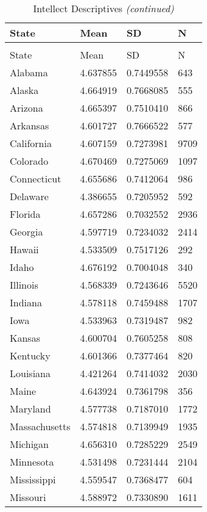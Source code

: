 \documentclass[
]{article}
\begin{document}
\begin{landscape}
\begin{longtable}[t]{llll}
\caption{\label{tab:KableOuput}Intellect Descriptives}\\
\toprule
State & Mean & SD & N\\
\midrule
\endfirsthead
\caption[]{\label{tab:KableOuput}Intellect Descriptives \textit{(continued)}}\\
\toprule
State & Mean & SD & N\\
\midrule
\endhead

\endfoot
\bottomrule
\endlastfoot
Alabama & 4.637855 & 0.7449558 & 643\\
Alaska & 4.664919 & 0.7668085 & 555\\
Arizona & 4.665397 & 0.7510410 & 866\\
Arkansas & 4.601727 & 0.7666522 & 577\\
California & 4.607159 & 0.7273981 & 9709\\
\addlinespace
Colorado & 4.670469 & 0.7275069 & 1097\\
Connecticut & 4.655686 & 0.7412064 & 986\\
Delaware & 4.386655 & 0.7205952 & 592\\
Florida & 4.657286 & 0.7032552 & 2936\\
Georgia & 4.597719 & 0.7234032 & 2414\\
\addlinespace
Hawaii & 4.533509 & 0.7517126 & 292\\
Idaho & 4.676192 & 0.7004048 & 340\\
Illinois & 4.568339 & 0.7243646 & 5520\\
Indiana & 4.578118 & 0.7459488 & 1707\\
Iowa & 4.533963 & 0.7319487 & 982\\
\addlinespace
Kansas & 4.600704 & 0.7605258 & 808\\
Kentucky & 4.601366 & 0.7377464 & 820\\
Louisiana & 4.421264 & 0.7414032 & 2030\\
Maine & 4.643924 & 0.7361798 & 356\\
Maryland & 4.577738 & 0.7187010 & 1772\\
\addlinespace
Massachusetts & 4.574818 & 0.7139949 & 1935\\
Michigan & 4.656310 & 0.7285229 & 2549\\
Minnesota & 4.531498 & 0.7231444 & 2104\\
Mississippi & 4.559547 & 0.7368477 & 604\\
Missouri & 4.588972 & 0.7330890 & 1611\\

\end{longtable}
\end{landscape}
\end{document}
